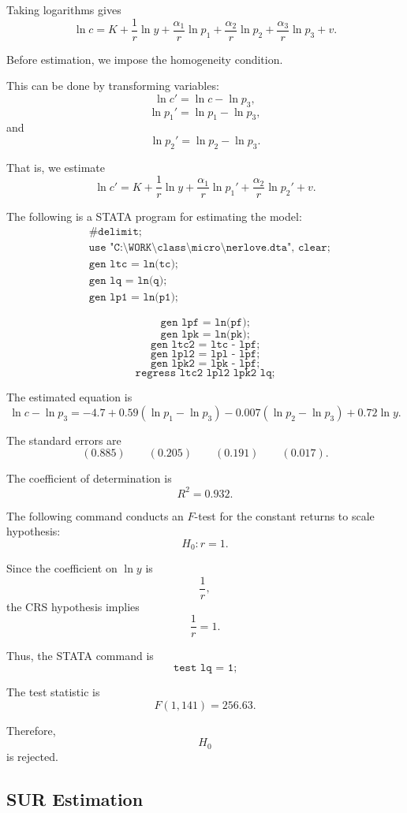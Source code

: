 Taking logarithms gives
\[
\ln c
=
K
+
\frac{1}{r}\ln y
+
\frac{\alpha_1}{r}\ln p_1
+
\frac{\alpha_2}{r}\ln p_2
+
\frac{\alpha_3}{r}\ln p_3
+
v.
\]

Before estimation, we impose the homogeneity condition.

This can be done by transforming variables:
\[
\ln c'
=
\ln c-\ln p_3,
\]
\[
\ln p_1'
=
\ln p_1-\ln p_3,
\]
and
\[
\ln p_2'
=
\ln p_2-\ln p_3.
\]

That is, we estimate
\[
\ln c'
=
K
+
\frac{1}{r}\ln y
+
\frac{\alpha_1}{r}\ln p_1'
+
\frac{\alpha_2}{r}\ln p_2'
+
v.
\]

The following is a STATA program for estimating the model:
\[
\begin{aligned}
&\texttt{\#delimit;}\\
&\texttt{use "C:\textbackslash WORK\textbackslash class\textbackslash micro\textbackslash nerlove.dta", clear;}\\
&\texttt{gen ltc = ln(tc);}\\
&\texttt{gen lq = ln(q);}\\
&\texttt{gen lp1 = ln(p1);}
\end{aligned}
\]


\[
\texttt{gen lpf = ln(pf);}
\]
\[
\texttt{gen lpk = ln(pk);}
\]
\[
\texttt{gen ltc2 = ltc - lpf;}
\]
\[
\texttt{gen lpl2 = lpl - lpf;}
\]
\[
\texttt{gen lpk2 = lpk - lpf;}
\]
\[
\texttt{regress ltc2 lpl2 lpk2 lq;}
\]

The estimated equation is
\[
\ln c-\ln p_3
=
-4.7
+
0.59(\ln p_1-\ln p_3)
-
0.007(\ln p_2-\ln p_3)
+
0.72\ln y.
\]

The standard errors are
\[
(0.885)
\qquad
(0.205)
\qquad
(0.191)
\qquad
(0.017).
\]

The coefficient of determination is
\[
R^2=0.932.
\]

The following command conducts an \(F\)-test for the constant returns to scale hypothesis:
\[
H_0:r=1.
\]

Since the coefficient on \(\ln y\) is
\[
\frac{1}{r},
\]
the CRS hypothesis implies
\[
\frac{1}{r}=1.
\]

Thus, the STATA command is
\[
\texttt{test lq = 1;}
\]

The test statistic is
\[
F(1,141)=256.63.
\]

Therefore,
\[
H_0
\]
is rejected.

\subsection{SUR Estimation}

